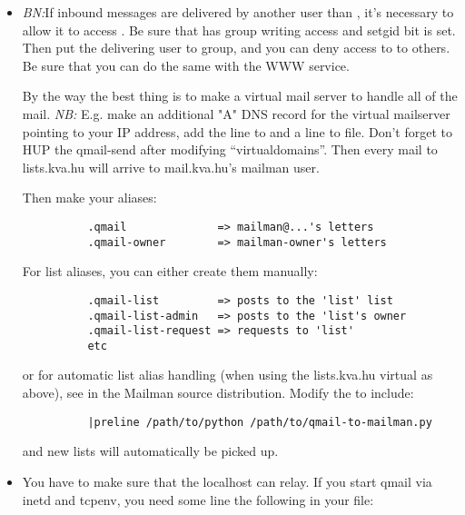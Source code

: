 \documentclass{howto}
\begin{document}
\begin{itemize}
\item \emph{BN:}If inbound messages are delivered by another user than
      , it's necessary to allow it to access .
      Be sure that  has group writing access and setgid bit is
      set.  Then put the delivering user to  group, and you can
      deny access to  to others.  Be sure that you can do the
      same with the WWW service.

      By the way the best thing is to make a virtual mail server to handle all
      of the mail.  \emph{NB:} E.g. make an additional "A" DNS record for the
      virtual mailserver pointing to your IP address, add the line
       to 
      and a  line to 
      file.  Don't forget to HUP the qmail-send after modifying
      ``virtualdomains''.  Then every mail to lists.kva.hu will arrive to
      mail.kva.hu's mailman user.

      Then make your aliases:

\begin{verbatim}
          .qmail              => mailman@...'s letters
          .qmail-owner        => mailman-owner's letters
\end{verbatim}

      For list aliases, you can either create them manually:

\begin{verbatim}
          .qmail-list         => posts to the 'list' list
          .qmail-list-admin   => posts to the 'list's owner
          .qmail-list-request => requests to 'list'
          etc
\end{verbatim}

      or for automatic list alias handling (when using the lists.kva.hu
      virtual as above), see  in the Mailman
      source distribution.  Modify the  to
      include:

\begin{verbatim}
          |preline /path/to/python /path/to/qmail-to-mailman.py
\end{verbatim}

      and new lists will automatically be picked up.

\item You have to make sure that the localhost can relay.  If you start qmail
      via inetd and tcpenv, you need some line the following in your
       file:


\end{itemize}
\end{document}
